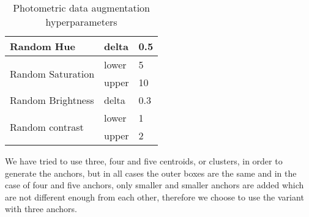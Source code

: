    \begin{table}[h]
    \centering
    \caption{Photometric data augmentation hyperparameters}
    \begin{tabular}{l|ll}
    Random Hue                                              & delta & 0.5 \\ \hline
    \multicolumn{1}{c|}{\multirow{2}{*}{Random Saturation}} & lower & 5   \\
    \multicolumn{1}{c|}{}                                   & upper & 10  \\ \hline
    Random Brightness                                       & delta & 0.3 \\ \hline
    \multirow{2}{*}{Random contrast}                        & lower & 1   \\
                                                            & upper & 2  
    \end{tabular}
    
    \label{photometric_hyperparameters}
    \end{table}
    
    We have tried to use three, four and five centroids, or clusters, in order to generate the anchors, but in all cases the outer boxes are the same and in the case of four and five anchors, only smaller and smaller anchors are added which are not different enough from each other, therefore we choose to use the variant with three anchors.
    
    
    
